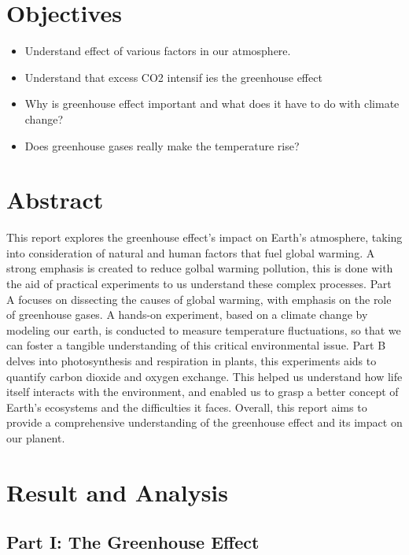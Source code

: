 \documentclass[a4paper, 12pt, english]{article}
\begin{document}


\newpage
\section{Objectives}
\begin{itemize}
	\item Understand effect of various factors in our atmosphere.
	\item Understand that excess CO2 intensif ies the greenhouse effect
	\item Why is greenhouse effect important and what does it have to do with climate
	      change?
	\item Does greenhouse gases really make the temperature rise?
\end{itemize}
\section{Abstract}
This report explores the greenhouse effect's impact on Earth's atmosphere, taking into consideration of natural and human factors that fuel
global warming. A strong emphasis is created to reduce golbal warming pollution, this is done with the aid of practical experiments to us understand 
these complex processes. Part A focuses on dissecting the causes of global warming, with emphasis on the role of greenhouse gases. 
A hands-on experiment, based on a climate change by modeling our earth, is conducted to measure temperature fluctuations, so that we can foster a tangible understanding of this 
critical environmental issue. Part B delves into photosynthesis and respiration in plants, this experiments aids to quantify carbon dioxide and oxygen 
exchange. This helped us understand how life itself interacts with the environment, and enabled us to grasp a better concept
of Earth's ecosystems and the difficulties it faces. Overall, this report aims to provide a comprehensive understanding of the greenhouse effect and its impact on our planent. 
\section{Result and Analysis}
\subsection{Part I: The Greenhouse Effect}
\end{document}
